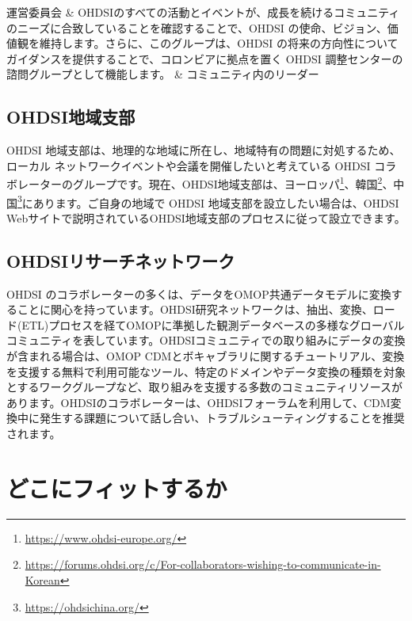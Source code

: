 \documentclass[
  11pt]{book}
\theoremstyle{definition}
\theoremstyle{definition}
\theoremstyle{definition}
\theoremstyle{definition}
\theoremstyle{remark}
\begin{document}
\begin{longtable}[]
運営委員会 & OHDSIのすべての活動とイベントが、成長を続けるコミュニティのニーズに合致していることを確認することで、OHDSI の使命、ビジョン、価値観を維持します。さらに、このグループは、OHDSI の将来の方向性についてガイダンスを提供することで、コロンビアに拠点を置く OHDSI 調整センターの諮問グループとして機能します。 & コミュニティ内のリーダー \\
\end{longtable}

\subsection{OHDSI地域支部}\label{ohdsiux5730ux57dfux652fux90e8}

OHDSI 地域支部は、地理的な地域に所在し、地域特有の問題に対処するため、ローカル ネットワークイベントや会議を開催したいと考えている OHDSI コラボレーターのグループです。現在、OHDSI地域支部は、ヨーロッパ\footnote{\url{https://www.ohdsi-europe.org/}}、韓国\footnote{\url{https://forums.ohdsi.org/c/For-collaborators-wishing-to-communicate-in-Korean}}、中国\footnote{\url{https://ohdsichina.org/}}にあります。ご自身の地域で OHDSI 地域支部を設立したい場合は、OHDSI Webサイトで説明されているOHDSI地域支部のプロセスに従って設立できます。

\subsection{OHDSIリサーチネットワーク}\label{ohdsiux30eaux30b5ux30fcux30c1ux30cdux30c3ux30c8ux30efux30fcux30af}

OHDSI のコラボレーターの多くは、データをOMOP共通データモデルに変換することに関心を持っています。OHDSI研究ネットワークは、抽出、変換、ロード(ETL)プロセスを経てOMOPに準拠した観測データベースの多様なグローバルコミュニティを表しています。OHDSIコミュニティでの取り組みにデータの変換が含まれる場合は、OMOP CDMとボキャブラリに関するチュートリアル、変換を支援する無料で利用可能なツール、特定のドメインやデータ変換の種類を対象とするワークグループなど、取り組みを支援する多数のコミュニティリソースがあります。OHDSIのコラボレーターは、OHDSIフォーラムを利用して、CDM変換中に発生する課題について話し合い、トラブルシューティングすることを推奨されます。

\section{どこにフィットするか}\label{ux3069ux3053ux306bux30d5ux30a3ux30c3ux30c8ux3059ux308bux304b}
\end{document}
